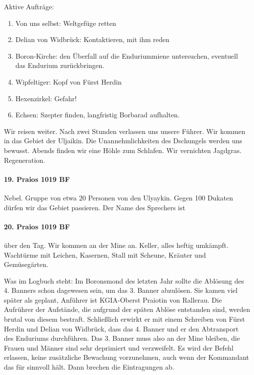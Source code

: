 Aktive Aufträge:
\begin{enumerate}
\item {\color{green}Von uns selbst: Weltgefüge retten}
\item {\color{red}Delian von Widbrück: Kontaktieren, mit ihm reden}
\item {\color{green}Boron-Kirche: den Überfall auf die Enduriummiene untersuchen, eventuell das Endurium zurückbringen.}
\item {\color{red}Wipfeltiger: Kopf von Fürst Herdin}
\item {\color{orange}Hexenzirkel: Gefahr!}
\item {\color{green}Echsen: Szepter finden, langfristig Borbarad aufhalten.}
\end{enumerate}
Wir reisen weiter. Nach zwei Stunden verlassen uns unsere Führer. Wir kommen in das Gebiet der Uljaikin. Die Unannehmlichkeiten des Dschungels werden uns bewusst. 
Abends finden wir eine Höhle zum Schlafen. Wir vernichten Jagdgras. 
 Regeneration. 

\paragraph{19. Praios 1019 BF}
Nebel. Gruppe von etwa 20 Personen von den Ulyaykin. Gegen 100 Dukaten dürfen wir das Gebiet passieren. Der Name des Sprechers ist 
\paragraph{20. Praios 1019 BF} 
 über den Tag. Wir kommen an der Mine an. Keller, alles heftig umkämpft. Wachtürme mit Leichen, Kasernen, Stall mit Scheune, Kräuter und Gemüsegärten. 

Was im Logbuch steht:
Im Boronsmond des letzten Jahr sollte die Ablösung des 4. Banners schon dagewesen sein, um das 3. Banner abzulösen. Sie kamen viel später als geplant, Anführer ist KGIA-Oberst Praiotin von Rallerau. Die Aufrührer der Aufstände, die aufgrund der späten Ablöse entstanden sind, werden brutal von diesem bestraft. 
Schließlich erwirkt er mit einem Schreiben von Fürst Herdin und Delian von Widbrück, dass das 4. Banner und er den Abtransport des Enduriums durchführen. Das 3. Banner muss also an der Mine bleiben, die Frauen und Männer sind sehr deprimiert und verzweifelt. Es wird der Befehl erlassen, keine zusätzliche Bewachung vorzunehmen, auch wenn der Kommandant das für sinnvoll hält. Dann brechen die Eintragungen ab. 

